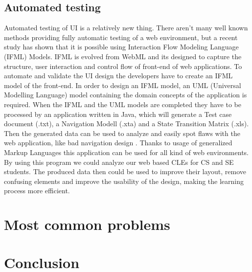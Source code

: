 \documentclass[10pt,english,a4paper]{article}
\begin{document}
\subsection{Automated testing}
Automated testing of UI is a relatively new thing\cite{automated_testing_ifml}. There aren't many well known methods
providing fully automatic testing of a web environment, but a recent study has shown that
it is possible using Interaction Flow Modeling Language (IFML) Models\cite{automated_testing_ifml}.
IFML is evolved from WebML and its designed to capture the structure, user interaction and control
flow of front-end of web applications\cite{automated_testing_ifml}.
To automate and validate the UI design the developers have to create an IFML model
of the front-end. In order to design an IFML model, an UML (Universal Modelling Language) model 
containing the domain concepts of the application is required\cite{automated_testing_ifml}. 
When the IFML and the UML models are completed they have to be processed by an application written 
in Java, which will generate a Test case document (.txt), a Navigation Modell (.xta) and a State Transition 
Matrix (.xls). Then the generated data can be used to analyze and easily spot flaws with the web application, like bad navigation design
\cite{automated_testing_ifml}. 
Thanks to usage of generalized Markup Languages this application can be used for all kind of web environments. 
By using this program we could analyze our web based CLEs for CS and SE students. 
The produced data then could be used to improve their layout, remove confusing elements and improve the usability of the design,
making the learning process more efficient.


\section{Most common problems}\label{problems}


\section{Conclusion}




\end{document}
